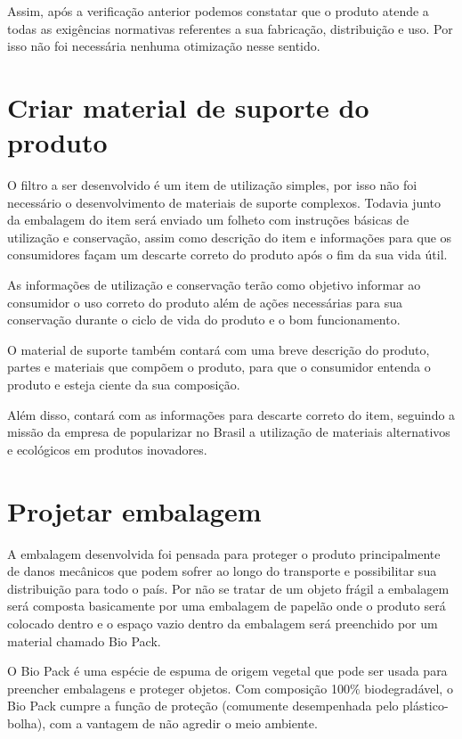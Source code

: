 \documentclass[
	12pt,				%
	openright,			%
	oneside,			%
	a4paper,			%
	english,			%
	french,				%
	spanish,			%
	brazil				%
	]{abntex2}
\begin{document}
Assim, após a verificação anterior podemos constatar que o produto atende a todas as exigências normativas referentes a sua fabricação, distribuição e uso. Por isso não foi necessária nenhuma otimização nesse sentido.


\section{Criar material de suporte do produto}

O filtro a ser desenvolvido é um item de utilização simples, por isso não foi necessário o desenvolvimento de materiais de suporte complexos. Todavia junto da embalagem do item será enviado um folheto com instruções básicas de utilização e conservação, assim como descrição do item e informações para que os consumidores façam um descarte correto do produto após o fim da sua vida útil.

As informações de utilização e conservação terão como objetivo informar ao consumidor o uso correto do produto além de ações necessárias para sua conservação durante o ciclo de vida do produto e o bom funcionamento.

O material de suporte também contará com uma breve descrição do produto, partes e materiais que compõem o produto, para que o consumidor entenda o produto e esteja ciente da sua composição.

Além disso, contará com as informações para descarte correto do item, seguindo a missão da empresa de popularizar no Brasil a utilização de materiais alternativos e ecológicos em produtos inovadores.

\section{Projetar embalagem}

A embalagem desenvolvida foi pensada para proteger o produto principalmente de danos mecânicos que podem sofrer ao longo do transporte e possibilitar sua distribuição para todo o país. Por não se tratar de um objeto frágil a embalagem será composta basicamente por uma embalagem de papelão onde o produto será colocado dentro e o espaço vazio dentro da embalagem será preenchido por um material chamado Bio Pack.

O Bio Pack é uma espécie de espuma de origem vegetal que pode ser usada para preencher embalagens e proteger objetos. Com composição 100$\%$ biodegradável, o Bio Pack cumpre a função de proteção (comumente desempenhada pelo plástico-bolha), com a vantagem de não agredir o meio ambiente.
\end{document}
